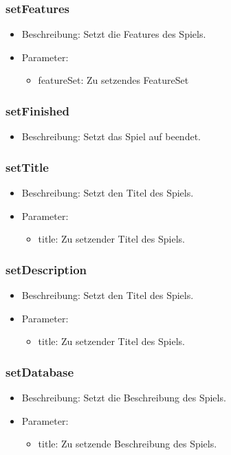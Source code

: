 \documentclass[a4paper]{scrreprt}
\begin{document}
	\subsubsection{setFeatures}
	\begin{itemize}
		\item Beschreibung: Setzt die Features des Spiels.
		\item Parameter:
		\begin{itemize}
			\item featureSet: Zu setzendes FeatureSet
		\end{itemize}
	\end{itemize}

	\subsubsection{setFinished}
	\begin{itemize}
		\item Beschreibung: Setzt das Spiel auf beendet.
	\end{itemize}

	\subsubsection{setTitle}
	\begin{itemize}
        \item Beschreibung: Setzt den Titel des Spiels.
        \item Parameter:
        \begin{itemize}
            \item title: Zu setzender Titel des Spiels.
        \end{itemize}
	\end{itemize}

	\subsubsection{setDescription}
    \begin{itemize}
        \item Beschreibung: Setzt den Titel des Spiels.
        \item Parameter:
        \begin{itemize}
            \item title: Zu setzender Titel des Spiels.
        \end{itemize}
    \end{itemize}

    \subsubsection{setDatabase}
    \begin{itemize}
        \item Beschreibung: Setzt die Beschreibung des Spiels.
        \item Parameter:
        \begin{itemize}
            \item title: Zu setzende Beschreibung des Spiels.
        \end{itemize}
    \end{itemize}
\end{document}
